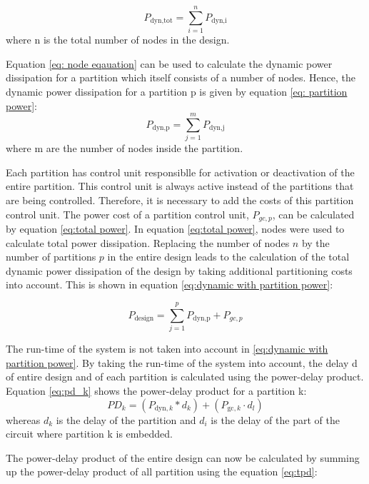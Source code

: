 \documentclass[conference]{IEEEtran}
\begin{document}
\begin{equation}
\label{eq:total power}
P_{\text{dyn,tot}} = \sum_{i=1}^{n} P_{\text{dyn,i}} 
\end{equation}
where n is the total number of nodes in the design. 

Equation \ref{eq: node eqauation} can be used to calculate the dynamic power dissipation for a partition which itself consists of a number of nodes. Hence, the dynamic power dissipation for a partition p is given by equation \ref{eq: partition power}:
\begin{equation}
\label{eq: partition power}
P_{\text{dyn,p}} = \sum_{j=1}^{m} P_{\text{dyn,j}} 
\end{equation}
where m are the number of nodes inside the partition. 


Each partition has control unit responsiblle for activation or deactivation of the entire partition. This control unit is always active instead of the partitions that are being controlled. Therefore, it is necessary to add the costs of this partition control unit. The power cost of a partition control unit, $P_{gc,p}$, can be calculated by equation \ref{eq:total power}. In equation \ref{eq:total power}, nodes were used to calculate total power dissipation. Replacing the number of nodes $n$ by the number of partitions $p$ in the entire design leads to the calculation of the total dynamic power dissipation of the design by taking additional partitioning costs into account. This is shown in equation \ref{eq:dynamic with partition power}:

\begin{equation}
\label{eq:dynamic with partition power}
P_{\text{design}} = \sum_{j=1}^{p} P_{\text{dyn,p}} + P_{gc,p} 
\end{equation}

The run-time of the system is not taken into account in \ref{eq:dynamic with partition power}. By taking the run-time of the system into account, the delay d of entire design and of each partition is calculated using the power-delay product. Equation \ref{eq:pd_k} shows the power-delay product for a partition k:
\begin{equation}
PD_k = (P_{\text{dyn},k} * d_k) + (P_{\text{gc},k} \cdot d_l)
\label{eq:pd_k}
\end{equation}
whereas $d_k$ is the delay of the partition and $d_i$ is the delay of the part of the circuit where partition k is embedded.

The power-delay product of the entire design can now be calculated by summing up the power-delay product of all partition using the equation \ref{eq:tpd}:
\end{document}

